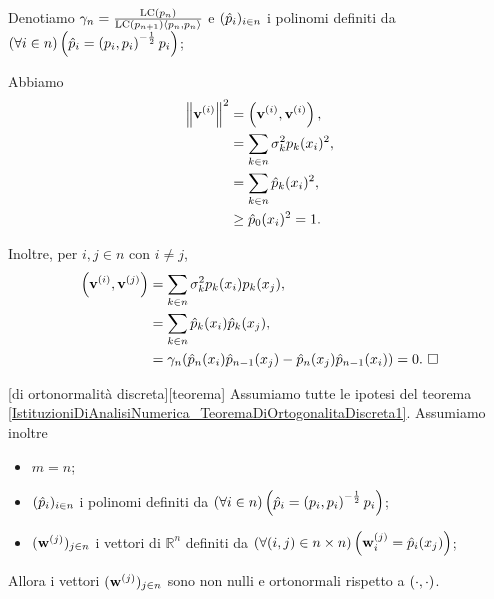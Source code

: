 \Proof Denotiamo $\gamma_n = \frac{\text{LC} \left ( p_n \right )}{\text{LC} \left ( p_{n + 1} \right )\left \langle p_n , p_n \right \rangle}$ e $(\hat{p}_i)_{i \in n}$ i polinomi definiti da $\left ( \forall i \in n \right ) \left ( \hat{p}_i = \left ( p_i , p_i \right )^{-\frac{1}{2}}p_i \right )$;
\par Abbiamo
\begin{align*}
	\Norm{\Vector^{(i)}}^2
	&= \ScalarProduct{\Vector^{(i)}}{\Vector^{(i)}},\\
	&= \sum_{k \in n} \sigma_k^2 \OrthogonalPolynomial_k(x_i)^2,\\
	&= \sum_{k \in n} \OrthonormalPolynomial_k(x_i)^2,\\
	&\geq \OrthonormalPolynomial_0(x_i)^2 = 1.
\end{align*}
\par Inoltre, per $i, j \in n$ con $i \neq j$,
\begin{align*}
	\left ( \mathbf{v}^{(i)} , \mathbf{v}^{(j)} \right )
	&= \sum_{k \in n} \sigma_k^2 p_k(x_i)p_k(x_j),\\
	&= \sum_{k \in n} \hat{p}_k(x_i)\hat{p}_k(x_j),\\
	&= \gamma_n(\hat{p}_n(x_i)\hat{p}_{n - 1}(x_j) - \hat{p}_n(x_j)\hat{p}_{n - 1}(x_i)) = 0.\text{ $\square$}
\end{align*}
\begin{Theorem}
	\label{IstituzioniDiAnalisiNumerica_TeoremaDiOrtonormalitaDiscreta}
	[di ortonormalit\`a discreta][teorema] Assumiamo tutte le ipotesi del teorema \ref{IstituzioniDiAnalisiNumerica_TeoremaDiOrtogonalitaDiscreta1}. Assumiamo inoltre
	\begin{itemize}
		\item $m = n$;
		\item $(\hat{p}_i)_{i \in n}$ i polinomi definiti da $\left ( \forall i \in n \right ) \left ( \hat{p}_i = \left ( p_i , p_i \right )^{-\frac{1}{2}}p_i \right )$;
		\item $(\mathbf{w}^{(j)})_{j \in n}$ i vettori di $\mathbb{R}^n$ definiti da $\left ( \forall (i,j) \in n \times n \right ) \left ( \mathbf{w}^{(j)}_i = \hat{p}_i(x_j) \right )$;
	\end{itemize}
	Allora i vettori $(\mathbf{w}^{(j)})_{j \in n}$ sono non nulli e ortonormali rispetto a $\left ( \cdot , \cdot \right )$.
\end{Theorem}
